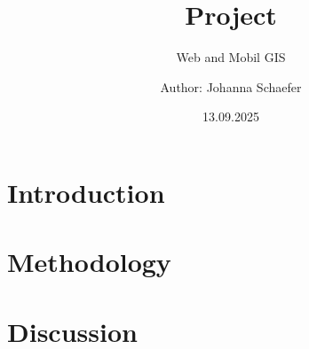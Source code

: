 



\title{Project}
\subtitle{Web and Mobil GIS}
\author{Author: Johanna Schaefer}
\date{13.09.2025}
\maketitle
\vspace{3cm}

\thispagestyle{empty}	%


\thispagestyle{empty}


 
\thispagestyle{empty}
\cleardoublepage
\thispagestyle{empty}
\newpage

\setcounter{page}{1}	%

\section{Introduction}


\section{Methodology}

\section{Discussion}
